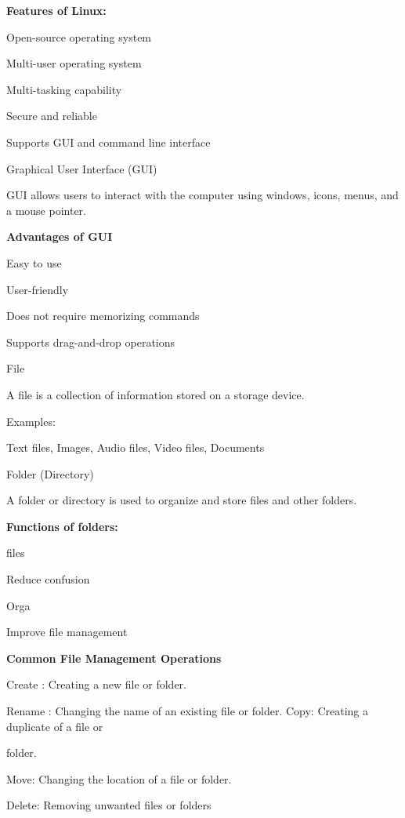 \documentclass[10pt,a4paper]{article}
\begin{document}
\medskip\noindent\textbf{Features of Linux:}\par
\noindent Open-source operating system\par
\noindent Multi-user operating system\par
\noindent Multi-tasking capability\par
\noindent Secure and reliable\par
\noindent Supports GUI and command line interface\par

\noindent Graphical User Interface (GUI)\par
\noindent GUI allows users to interact with the computer using windows, icons, menus, and a mouse pointer.\par
\medskip\noindent\textbf{Advantages of GUI}\par
\noindent Easy to use\par
\noindent User-friendly\par
\noindent Does not require memorizing commands\par
\noindent Supports drag-and-drop operations\par

\noindent File\par
\noindent A file is a collection of information stored on a storage device.\par

\noindent Examples:\par
\noindent Text files, Images, Audio files, Video files, Documents\par

\noindent Folder (Directory)\par
\noindent A folder or directory is used to organize and store files and other folders.\par

\medskip\noindent\textbf{Functions of folders:}\par
\noindent files\par
\noindent Reduce confusion\par
\clearpage
\noindent Orga\par
\noindent Improve file management\par

\medskip\noindent\textbf{Common File Management Operations}\par
\noindent Create : Creating a new file or folder.\par
\noindent Rename : Changing the name of an existing file or folder. Copy: Creating a duplicate of a file or\par
\noindent folder.\par
\noindent Move: Changing the location of a file or folder.\par
\noindent Delete: Removing unwanted files or folders\par
\end{document}
